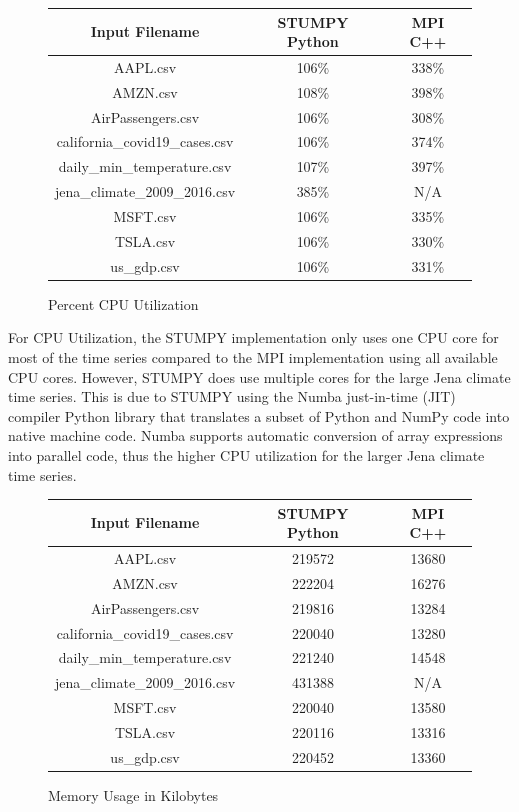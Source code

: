 \documentclass[conference]{IEEEtran}
\begin{document}
\begin{figure}
\caption{Percent CPU Utilization}
\begin{tabular}{|c|c|c|}
\hline
\textbf{Input Filename} & \textbf{STUMPY Python} & \textbf{MPI C++} \\ \hline \hline
AAPL.csv & 106\% & 338\% \\ \hline
AMZN.csv & 108\% & 398\% \\ \hline
AirPassengers.csv & 106\% & 308\% \\ \hline
california\_covid19\_cases.csv & 106\% & 374\% \\ \hline
daily\_min\_temperature.csv & 107\% & 397\% \\ \hline
jena\_climate\_2009\_2016.csv & 385\% & N/A \\ \hline
MSFT.csv & 106\% & 335\% \\ \hline
TSLA.csv & 106\% & 330\% \\ \hline
us\_gdp.csv & 106\% & 331\% \\ \hline \hline
\end{tabular}
\label{fig:CPU_Utilization}
\end{figure}

For CPU Utilization, the STUMPY implementation only uses one CPU core for most of the time series compared to the MPI implementation using all available CPU cores.  However, STUMPY does use multiple cores for the large Jena climate time series.  This is due to STUMPY using the Numba just-in-time (JIT) compiler Python library that translates a subset of Python and NumPy code into native machine code.  Numba supports automatic conversion of array expressions into parallel code\cite{Numba}, thus the higher CPU utilization for the larger Jena climate time series.  

\begin{figure}
\caption{Memory Usage in Kilobytes}
\begin{tabular}{|c|c|c|}
\hline
\textbf{Input Filename} & \textbf{STUMPY Python} & \textbf{MPI C++} \\ \hline \hline
AAPL.csv & 219572 & 13680 \\ \hline
AMZN.csv & 222204 & 16276 \\ \hline
AirPassengers.csv & 219816 & 13284 \\ \hline
california\_covid19\_cases.csv & 220040 & 13280 \\ \hline
daily\_min\_temperature.csv & 221240 & 14548 \\ \hline
jena\_climate\_2009\_2016.csv & 431388 & N/A \\ \hline
MSFT.csv & 220040 & 13580 \\ \hline
TSLA.csv & 220116 & 13316 \\ \hline
us\_gdp.csv & 220452 & 13360 \\ \hline \hline
\end{tabular}
\label{fig:Memory_Usage}
\end{figure}
\end{document}
